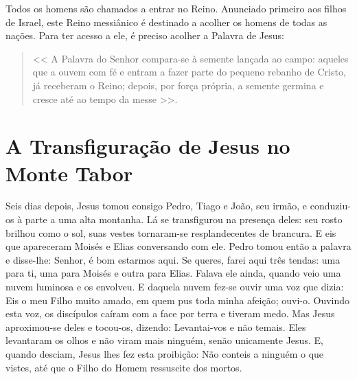 \documentclass{rosario}
\begin{document}



Todos os homens são chamados a entrar no Reino.
Anunciado primeiro aos filhos de Israel, este Reino messiânico é destinado a acolher os homens de todas as nações.
Para ter acesso a ele, é preciso acolher a Palavra de Jesus:
\begin{quote}
<< A Palavra do Senhor compara-se à semente lançada ao campo:
aqueles que a ouvem com fé e entram a fazer parte do pequeno rebanho de Cristo, já receberam o Reino;
depois, por força própria, a semente germina e cresce até ao tempo da messe >>.
\end{quote}


\section{A Transfiguração de Jesus no Monte Tabor}


Seis dias depois, Jesus tomou consigo Pedro, Tiago e João, seu irmão, e conduziu-os à parte a uma alta montanha.
Lá se transfigurou na presença deles: seu rosto brilhou como o sol, suas vestes tornaram-se resplandecentes de brancura.
E eis que apareceram Moisés e Elias conversando com ele.
Pedro tomou então a palavra e disse-lhe:
Senhor, é bom estarmos aqui. Se queres, farei aqui três tendas:
uma para ti, uma para Moisés e outra para Elias.
Falava ele ainda, quando veio uma nuvem luminosa e os envolveu.
E daquela nuvem fez-se ouvir uma voz que dizia:
Eis o meu Filho muito amado, em quem pus toda minha afeição; ouvi-o.
Ouvindo esta voz, os discípulos caíram com a face por terra e tiveram medo.
Mas Jesus aproximou-se deles e tocou-os, dizendo:
Levantai-vos e não temais.
Eles levantaram os olhos e não viram mais ninguém, senão unicamente Jesus.
E, quando desciam, Jesus lhes fez esta proibição:
Não conteis a ninguém o que vistes, até que o Filho do Homem ressuscite dos mortos.


\end{document}
